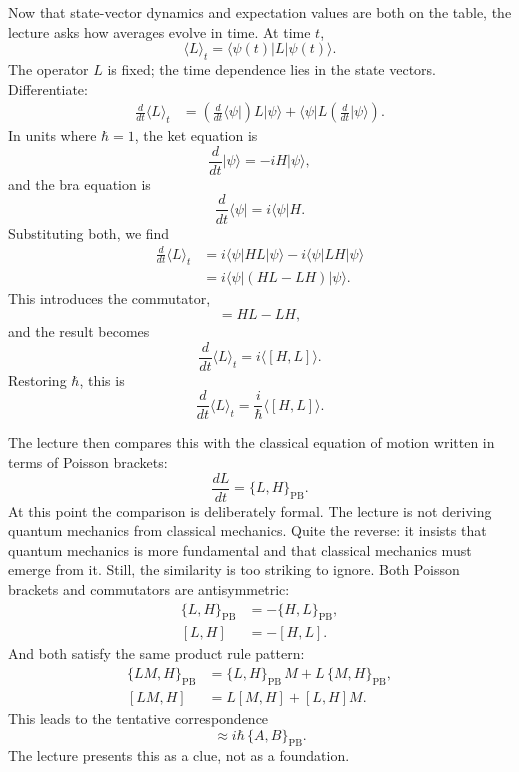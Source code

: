 Now that state-vector dynamics and expectation values are both on the table, the lecture asks how averages evolve in time. At time \(t\),
\begin{equation}
\langle L\rangle_t=\langle \psi(t)|L|\psi(t)\rangle.
\end{equation}
The operator \(L\) is fixed; the time dependence lies in the state vectors. Differentiate:
\begin{align}
\frac{d}{dt}\langle L\rangle_t
&=
\left(\frac{d}{dt}\langle \psi|\right)L|\psi\rangle
+
\langle \psi|L\left(\frac{d}{dt}|\psi\rangle\right).
\end{align}
In units where \(\hbar=1\), the ket equation is
\begin{equation}
\frac{d}{dt}|\psi\rangle=-iH|\psi\rangle,
\end{equation}
and the bra equation is
\begin{equation}
\frac{d}{dt}\langle \psi|=i\langle \psi|H.
\end{equation}
Substituting both, we find
\begin{align}
\frac{d}{dt}\langle L\rangle_t
&=
i\langle \psi|HL|\psi\rangle
-
i\langle \psi|LH|\psi\rangle \\
&=
i\langle \psi|(HL-LH)|\psi\rangle.
\end{align}
This introduces the commutator,
\begin{equation}
[H,L]=HL-LH,
\end{equation}
and the result becomes
\begin{equation}
\frac{d}{dt}\langle L\rangle_t=i\langle [H,L]\rangle.
\end{equation}
Restoring \(\hbar\), this is
\begin{equation}
\frac{d}{dt}\langle L\rangle_t=\frac{i}{\hbar}\langle [H,L]\rangle.
\end{equation}

The lecture then compares this with the classical equation of motion written in terms of Poisson brackets:
\begin{equation}
\frac{dL}{dt}=\{L,H\}_{\mathrm{PB}}.
\end{equation}
At this point the comparison is deliberately formal. The lecture is not deriving quantum mechanics from classical mechanics. Quite the reverse: it insists that quantum mechanics is more fundamental and that classical mechanics must emerge from it. Still, the similarity is too striking to ignore. Both Poisson brackets and commutators are antisymmetric:
\begin{align}
\{L,H\}_{\mathrm{PB}}&=-\{H,L\}_{\mathrm{PB}},\\
[L,H]&=-[H,L].
\end{align}
And both satisfy the same product rule pattern:
\begin{align}
\{LM,H\}_{\mathrm{PB}}&=\{L,H\}_{\mathrm{PB}}\,M+L\,\{M,H\}_{\mathrm{PB}},\\
[LM,H]&=L[M,H]+[L,H]M.
\end{align}
This leads to the tentative correspondence
\begin{equation}
[A,B]\approx i\hbar\,\{A,B\}_{\mathrm{PB}}.
\end{equation}
The lecture presents this as a clue, not as a foundation.

